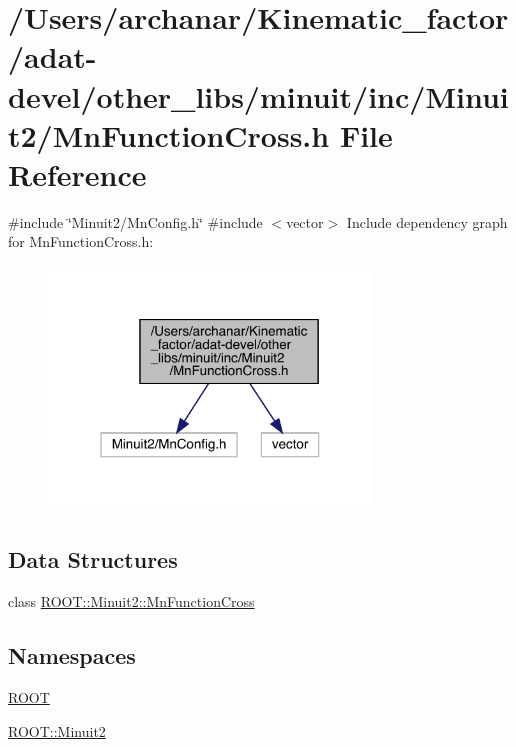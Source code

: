 \hypertarget{adat-devel_2other__libs_2minuit_2inc_2Minuit2_2MnFunctionCross_8h}{}\section{/\+Users/archanar/\+Kinematic\+\_\+factor/adat-\/devel/other\+\_\+libs/minuit/inc/\+Minuit2/\+Mn\+Function\+Cross.h File Reference}
\label{adat-devel_2other__libs_2minuit_2inc_2Minuit2_2MnFunctionCross_8h}
{\ttfamily \#include \char`\"{}Minuit2/\+Mn\+Config.\+h\char`\"{}}\newline
{\ttfamily \#include $<$vector$>$}\newline
Include dependency graph for Mn\+Function\+Cross.\+h\+:
\nopagebreak
\begin{figure}[H]
\begin{center}
\leavevmode
\includegraphics[width=244pt]{d4/df3/adat-devel_2other__libs_2minuit_2inc_2Minuit2_2MnFunctionCross_8h__incl}
\end{center}
\end{figure}
\subsection*{Data Structures}
\begin{DoxyCompactItemize}
\item 
class \mbox{\hyperlink{classROOT_1_1Minuit2_1_1MnFunctionCross}{R\+O\+O\+T\+::\+Minuit2\+::\+Mn\+Function\+Cross}}
\end{DoxyCompactItemize}
\subsection*{Namespaces}
\begin{DoxyCompactItemize}
\item 
 \mbox{\hyperlink{namespaceROOT}{R\+O\+OT}}
\item 
 \mbox{\hyperlink{namespaceROOT_1_1Minuit2}{R\+O\+O\+T\+::\+Minuit2}}
\end{DoxyCompactItemize}
